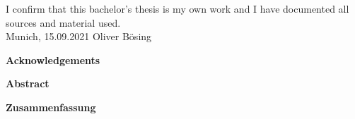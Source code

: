 \documentclass[11pt,
               a4paper,
               bibtotoc,
               idxtotoc,
               headsepline,
               footsepline,
               footexclude,
               BCOR12mm,
               DIV13,
               openany,   %
               ]
               {scrbook}
\def\doctype{Bachelor's Thesis\xspace}
\def\author{Oliver Bösing}
\def\date{15.09.2021}
\begin{document}
\addtolength{\hoffset}{\bcorcor}
\newpage


\cleardoubleemptypage

\thispagestyle{empty}
\vspace*{0.7\textheight}
\noindent
I confirm that this \MakeLowercase{\doctype} is my own work and I have documented all sources and material used.\\

\vspace{15mm}
\noindent
Munich, \date \hspace{5cm} \author
\cleardoubleemptypage


{}
\vspace*{2cm}
\begin{center}
    {\Large \bf Acknowledgements}
\end{center}
\vspace{1cm}


\cleardoublepage


{}
\vspace*{2cm}
\begin{center}
    {\Large \bf Abstract}
\end{center}
\vspace{1cm}


\cleardoublepage

{}
\vspace*{2cm}
\begin{center}
    {\Large \bf Zusammenfassung}
\end{center}
\vspace{1cm}
\end{document}
